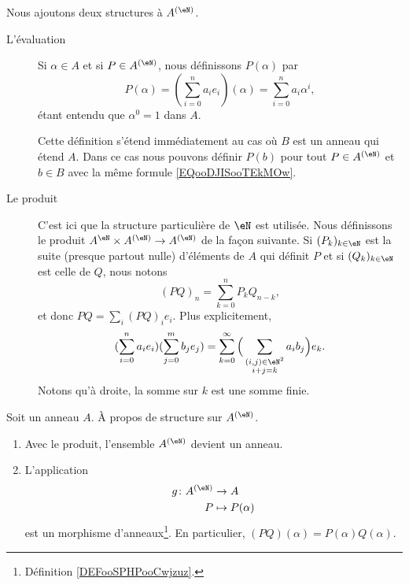 \begin{definition}      \label{DEFooNXKUooLrGeuh}
	Nous ajoutons deux structures à \( A^{(\eN)}\).
	\begin{description}
		\item[L'évaluation] Si \( \alpha\in A\) et si \( P\in A^{(\eN)}\), nous définissons \( P(\alpha)\) par
			\begin{equation}        \label{EQooDJISooTEkMOw}
				P(\alpha)=(\sum_{i=0}^{n}a_ie_i)(\alpha)=\sum_{i=0}^na_i\alpha^i,
			\end{equation}
			étant entendu que \( \alpha^0=1\) dans \( A\).

			Cette définition s'étend immédiatement au cas où \( B\) est un anneau qui étend \( A\). Dans ce cas nous pouvons définir \( P(b)\) pour tout \( P\in A^{(\eN)}\) et \( b\in B\) avec la même formule \eqref{EQooDJISooTEkMOw}.
		\item[Le produit] C'est ici que la structure particulière de \( \eN\) est utilisée. Nous définissons le produit \( A^{\eN}\times A^{(\eN)}\to A^{(\eN)}\) de la façon suivante. Si \( (P_k)_{k\in \eN}\) est la suite (presque partout nulle) d'éléments de \( A\) qui définit \( P\) et si \( (Q_k)_{k\in \eN}\) est celle de \( Q\), nous notons
			\begin{equation}    \label{EQooTNCSooKklisb}
				(PQ)_n=\sum_{k=0}^nP_kQ_{n-k},
			\end{equation}
			et donc \( PQ=\sum_i(PQ)_ie_i\). Plus explicitement,
			\begin{equation}    \label{EQooCIBUooAgpxjL}
				(\sum_{i=0}^na_ie_i)(\sum_{j=0}^mb_je_j)=\sum_{k=0}^{\infty}\Big( \sum_{\substack{  (i,j)\in \eN^2 \\i+j=k}}a_ib_j \Big)e_k.
			\end{equation}
			Notons qu'à droite, la somme sur \( k\) est une somme finie.
	\end{description}
\end{definition}

\begin{proposition}     \label{PROPooGDQCooHziCPH}
	Soit un anneau \( A\). À propos de structure sur \( A^{(\eN)}\).
	\begin{enumerate}
		\item
		      Avec le produit, l'ensemble \( A^{(\eN)}\) devient un anneau.
		\item
		      L'application
		      \begin{equation}
			      \begin{aligned}
				      g\colon A^{(\eN)} & \to A             \\
				      P                 & \mapsto P(\alpha)
			      \end{aligned}
		      \end{equation}
		      est un morphisme d'anneaux\footnote{Définition \ref{DEFooSPHPooCwjzuz}.}. En particulier, \( (PQ)(\alpha)=P(\alpha)Q(\alpha)\).
	\end{enumerate}
\end{proposition}

